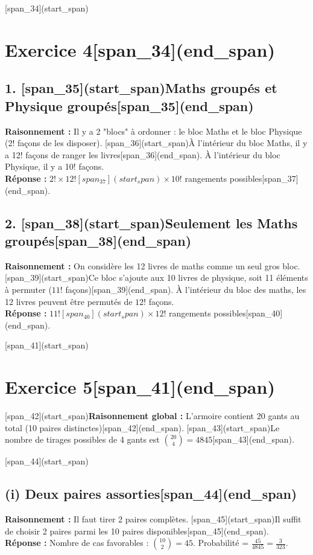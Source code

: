 \documentclass[11pt,a4paper]{article}
\begin{document}
[span_34](start_span)\section*{Exercice 4[span_34](end_span)}

\subsection*{1. [span_35](start_span)Maths groupés et Physique groupés[span_35](end_span)}
\textbf{Raisonnement :} Il y a 2 "blocs" à ordonner : le bloc Maths et le bloc Physique (2! façons de les disposer). [span_36](start_span)À l'intérieur du bloc Maths, il y a 12! façons de ranger les livres[span_36](end_span). À l'intérieur du bloc Physique, il y a 10! façons.\\
\textbf{Réponse :} $2! \times 12! [span_37](start_span)\times 10!$ rangements possibles[span_37](end_span).

\subsection*{2. [span_38](start_span)Seulement les Maths groupés[span_38](end_span)}
\textbf{Raisonnement :} On considère les 12 livres de maths comme un seul gros bloc. [span_39](start_span)Ce bloc s'ajoute aux 10 livres de physique, soit 11 éléments à permuter ($11!$ façons)[span_39](end_span). À l'intérieur du bloc des maths, les 12 livres peuvent être permutés de $12!$ façons.\\
\textbf{Réponse :} $11! [span_40](start_span)\times 12!$ rangements possibles[span_40](end_span).

\hrulefill

[span_41](start_span)\section*{Exercice 5[span_41](end_span)}
[span_42](start_span)\textbf{Raisonnement global :} L'armoire contient 20 gants au total (10 paires distinctes)[span_42](end_span). [span_43](start_span)Le nombre de tirages possibles de 4 gants est $\binom{20}{4} = 4845$[span_43](end_span).

[span_44](start_span)\subsection*{(i) Deux paires assorties[span_44](end_span)}
\textbf{Raisonnement :} Il faut tirer 2 paires complètes. [span_45](start_span)Il suffit de choisir 2 paires parmi les 10 paires disponibles[span_45](end_span).\\
\textbf{Réponse :} Nombre de cas favorables : $\binom{10}{2} = 45$. Probabilité = $\frac{45}{4845} = \frac{3}{323}$.
\end{document}
